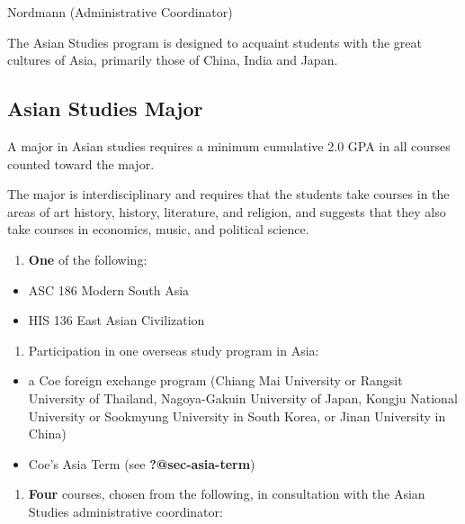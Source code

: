 \documentclass[
  letterpaper,
]{scrbook}
\providecommand{\tightlist}{%
  \setlength{\itemsep}{0pt}\setlength{\parskip}{0pt}}
\begin{document}
Nordmann (Administrative Coordinator)

The Asian Studies program is designed to acquaint students with the
great cultures of Asia, primarily those of China, India and Japan.

\subsection{Asian Studies Major}\label{asian-studies-major}

A major in Asian studies requires a minimum cumulative 2.0 GPA in all
courses counted toward the major.

The major is interdisciplinary and requires that the students take
courses in the areas of art history, history, literature, and religion,
and suggests that they also take courses in economics, music, and
political science.

\begin{enumerate}
\def\labelenumi{\arabic{enumi}.}
\tightlist
\item
  \textbf{One} of the following:
\end{enumerate}

\begin{itemize}
\tightlist
\item
  ASC 186 Modern South Asia\\
\item
  HIS 136 East Asian Civilization
\end{itemize}

\begin{enumerate}
\def\labelenumi{\arabic{enumi}.}
\setcounter{enumi}{1}
\tightlist
\item
  Participation in one overseas study program in Asia:
\end{enumerate}

\begin{itemize}
\tightlist
\item
  a Coe foreign exchange program (Chiang Mai University or Rangsit
  University of Thailand, Nagoya-Gakuin University of Japan, Kongju
  National University or Sookmyung University in South Korea, or Jinan
  University in China)\\
\item
  Coe's Asia Term (see \textbf{?@sec-asia-term})
\end{itemize}

\begin{enumerate}
\def\labelenumi{\arabic{enumi}.}
\setcounter{enumi}{2}
\tightlist
\item
  \textbf{Four} courses, chosen from the following, in consultation with
  the Asian Studies administrative coordinator:
\end{enumerate}
\end{document}
